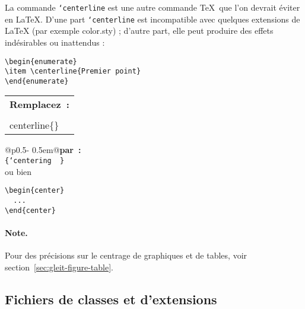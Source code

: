 \documentclass[fontsize=11pt, paper=a4, pagesize, captions=tableheading, numbers=enddot, toc=graduated, footnotes=multiple]{scrartcl}%
\makeatletter
\DeclareRobustCommand*{\Macro}[1]{\mbox{\texttt{\char`\\#1}}}
\DeclareRobustCommand*{\LMacro}[2]{\mbox{\texttt{\char`\\#1\{#2\}}}}
\DeclareRobustCommand*{\GMacro}[2]{\mbox{\texttt{\{\char`\\#1\ #2\}}}}
\newcommand{\Paket}[1]{\textsf{#1.sty}\xspace}
\newenvironment{Ers}[1][\linewidth]{%
  \par\bigskip\noindent\marginline{\textcolor{gruen}{\boldmath $\triangleright$}}\begin{tabular}[t]{@{}p{0.5\textwidth}@{}}\textcolor{rot}{\textbf{\textsf{Remplacez~:}}%
}\\[2pt] \rahmenpr[#1]}%
{\endrahmenpr\end{tabular}}
\newenvironment{Dur}[1][0.5\textwidth]{%
\noindent\begin{tabular}[t]{@{}p{0.5\textwidth - 0.5em}@{}}\textcolor{gruen}{\textbf{\textsf{par~:}}}\\[2pt]\rahmenpg[#1]}%
{\endrahmenpg\end{tabular}\smallskip\noindent}
\makeatother
\begin{document}
La commande \Macro{centerline} est une autre commande \TeX\ que l'on devrait éviter en \LaTeX. D'une part \Macro{centerline} est incompatible avec quelques extensions de \LaTeX{} (par exemple \Paket{color}) ; d'autre part, elle peut produire des effets indésirables ou inattendus :
\begin{center}
  \begin{minipage}[t]{.45\textwidth}
\begin{verbatim}
\begin{enumerate}
\item \centerline{Premier point}
\end{enumerate}
\end{verbatim}
  \end{minipage}%
 \hfill%

\end{center}
\begin{Ers}
  \LMacro{centerline}{\textellipsis}
\end{Ers}
\begin{Dur}
  \GMacro{centering}{\textellipsis\,}\\ {\small ou bien}\\
  \begin{varwidth}[t]{\linewidth}
\begin{verbatim}
\begin{center}
  ...
\end{center}
\end{verbatim}
  \end{varwidth}
\end{Dur}

\paragraph{Note.}
\label{sec:anmerkung-5}

Pour des précisions sur le centrage de graphiques et de tables, voir section~\vref{sec:gleit-figure-table}.

\subsection{Fichiers de classes et d'extensions}
\label{sec:pakete}
\end{document}
